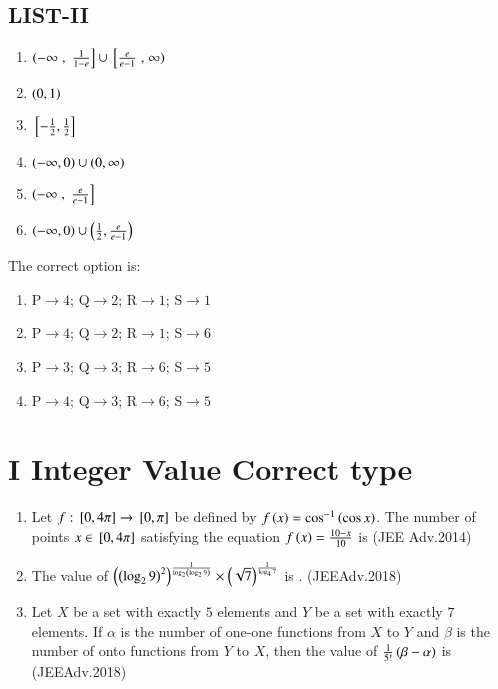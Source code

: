 \documentclass[journal,12pt,onecolumn,article]{IEEEtran}
\theoremstyle{remark}
\begin{document}
\begin{enumerate}
\begin{multicols}{2}
	\section*{LIST-II}
\begin{enumerate}
	\item $\left(-\infty\right.,{}\left.\frac{1}{1-e}\right]\cup{}\left[\frac{e}{e-1}\right.,\left.\infty\right)$
	\item $\left(0,1\right)$
	\item ${}\left[-\frac{1}{2},\frac{1}{2}\right]$
	\item $\left(-\infty,0\right)\cup\left(0,\infty\right)$
	\item $\left(-\infty\right.,{}\left.\frac{e}{e-1}\right]$
	\item $\left(-\infty,0\right)\cup\left(\frac{1}{2},\frac{e}{e-1}\right)$
\end{enumerate}
\end{multicols}
The correct option is:
\begin{multicols}{2}
		\begin{enumerate}
		\item P$\to4$; Q$\to2$; R$\to1$; S$\to1$
		\item P$\to4$; Q$\to2$; R$\to1$; S$\to6$
	\columnbreak
		\item P$\to3$; Q$\to3$; R$\to6$; S$\to5$
		\item P$\to4$; Q$\to3$; R$\to6$; S$\to5$
	\end{enumerate}
\end{multicols}
\end{enumerate}
	    \section*{I Integer Value Correct type}
		   \begin{enumerate}
			   \item Let $f:{}\left[0,4\pi\right]\to{}\left[0,\pi\right]$ be defined by $f\left(x\right)=\cos^{-1}\left(\cos x\right)$. The number of points $x\in{}\left[0,4\pi\right]$ satisfying the equation  ${f\left(x\right)=\frac{10-x}{10}}$ is \hfill(JEE Adv.2014)
			   \item The  value  of $\left(\left(\log_29\right)^2\right)^{\frac{1}{\log_2\left(\log_29\right)}}\times \left(\sqrt7\right)^{\frac{1}{\log_47}}$ is .
				   \hfill(JEEAdv.2018)
			   \item Let $X$ be a set with exactly $5$ elements and $Y$ be a set with exactly $7$ elements. If $\alpha$ is the number of one-one functions from $X$ to $Y$ and $\beta$ is the number of onto functions from $Y$ to $X$, then the value of $\frac{1}{5!}\left(\beta-\alpha\right)$ is \hfill(JEEAdv.2018)
		   \end{enumerate}
\end{document}
